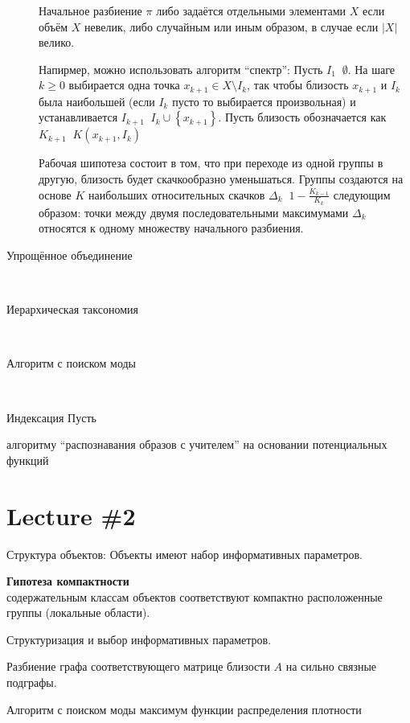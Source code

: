 \documentclass[a4paper]{article}
\newcommand{\obj}[1]{{\left\{ #1 \right \}}}
\newcommand{\abs}[1]{{\left | #1 \right |}}
\newcommand{\defn}{\mathop{\overset{\Delta}{=}}\nolimits}
\begin{document}
\begin{description}
Начальное разбиение $\pi$ либо задаётся отдельными элементами $X$ если объём $X$ невелик, либо случайным или иным образом, в случае если $\abs{X}$ велико.

Напирмер, можно использовать алгоритм ``спектр'':
Пусть $I_1 \defn \emptyset$. На шаге $k\geq0$ выбирается одна точка $x_{k+1}\in X\setminus I_k$,
так чтобы близость $x_{k+1}$ и $I_k$ была наибольшей (если $I_k$ пусто то выбирается произвольная)
и устанавливается $I_{k+1} \defn I_k \cup \obj{x_{k+1}}$.
Пусть близость обозначается как $K_{k+1} \defn K(x_{k+1},I_k)$

Рабочая шипотеза состоит в том, что при переходе из одной группы в другую, близость будет скачкообразно уменьшаться.
Группы создаются на основе $K$ наибольших относительных скачков $\Delta_k \defn 1-\frac{K_{k-1}}{K_k}$
следующим образом: точки между двумя последовательными максимумами $\Delta_k$ относятся к одному множеству начального разбиения.

\item[Упрощённое объединение] \hfill \\
\item[Иерархическая таксономия] \hfill \\
\item[Алгоритм с поиском моды] \hfill \\

\end{description}
Индексация
Пусть 

алгоритму ``распознавания образов с учителем'' на основании потенциальных функций




\section{Lecture \#2} %
\label{sec:lecture_2}

Структура объектов: Объекты имеют набор информативных параметров.

\textbf{Гипотеза компактности}\hfill\\
содержательным классам объектов соответствуют компактно расположенные группы (локальные области).

Структуризация и выбор информативных параметров.


Разбиение графа соответствующего матрице близости $A$ на сильно связные подграфы.

Алгоритм с поиском моды
максимум функции распределения плотности
\end{document}
